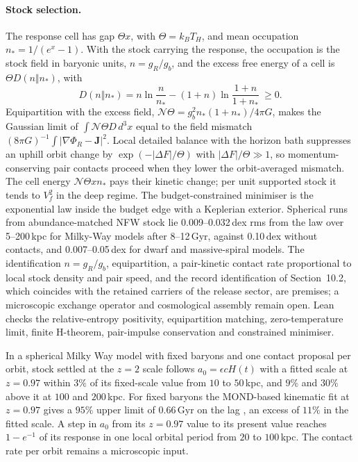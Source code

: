 \documentclass[11pt]{article}
\begin{document}
\paragraph{Stock selection.}
The response cell has gap $\Theta x$, with $\Theta=k_BT_H$, and mean occupation $n_*=1/(e^x-1)$. With the stock carrying the response, the occupation is the stock field in baryonic units, $n=g_R/g_b$, and the excess free energy of a cell is $\Theta D(n\Vert n_*)$, with
\[
D(n\Vert n_*)=n\ln\frac{n}{n_*}-(1+n)\ln\frac{1+n}{1+n_*}\ \ge0 .
\]
Equipartition with the excess field, $\mathcal N\Theta=g_b^2n_*(1+n_*)/4\pi G$, makes the Gaussian limit of $\int\mathcal N\Theta D\,d^3x$ equal to the field mismatch $(8\pi G)^{-1}\int|\nabla\Phi_R-\mathbf J|^2$. Local detailed balance with the horizon bath suppresses an uphill orbit change by $\exp(-|\Delta F|/\Theta)$ with $|\Delta F|/\Theta\gg1$, so momentum-conserving pair contacts proceed when they lower the orbit-averaged mismatch. The cell energy $\mathcal N\Theta xn_*$ pays their kinetic change; per unit supported stock it tends to $V_f^2$ in the deep regime. The budget-constrained minimiser is the exponential law inside the budget edge with a Keplerian exterior. Spherical runs from abundance-matched NFW stock lie 0.009--0.032\,dex rms from the law over 5--200\,kpc for Milky-Way models after 8--12\,Gyr, against 0.10\,dex without contacts, and 0.007--0.05\,dex for dwarf and massive-spiral models. The identification $n=g_R/g_b$, equipartition, a pair-kinetic contact rate proportional to local stock density and pair speed, and the record identification of Section~10.2, which coincides with the retained carriers of the release sector, are premises; a microscopic exchange operator and cosmological assembly remain open. Lean checks the relative-entropy positivity, equipartition matching, zero-temperature limit, finite H-theorem, pair-impulse conservation and constrained minimiser.

In a spherical Milky Way model with fixed baryons and one contact proposal per orbit, stock settled at the $z=2$ scale follows $a_0=\epsilon cH(t)$ with a fitted scale at $z=0.97$ within $3\%$ of its fixed-scale value from $10$ to $50\,$kpc, and $9\%$ and $30\%$ above it at $100$ and $200\,$kpc. For fixed baryons the MOND-based kinematic fit at $z=0.97$ gives a $95\%$ upper limit of $0.66\,$Gyr on the lag \citep{Ciocan2026}, an excess of $11\%$ in the fitted scale. A step in $a_0$ from its $z=0.97$ value to its present value reaches $1-e^{-1}$ of its response in one local orbital period from $20$ to $100\,$kpc. The contact rate per orbit remains a microscopic input.
\end{document}

